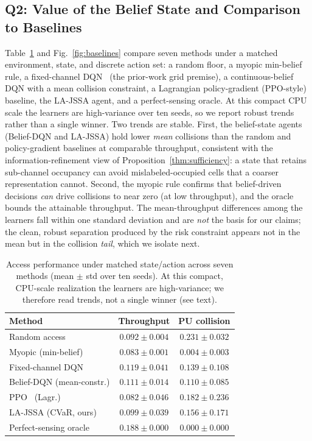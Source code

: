 \documentclass[journal]{IEEEtran}
\begin{document}
\subsection{Q2: Value of the Belief State and Comparison to Baselines}
Table~\ref{tab:metrics} and Fig.~\ref{fig:baselines} compare seven methods
under a matched environment, state, and discrete action set: a random floor,
a myopic min-belief rule, a fixed-channel DQN~\cite{wang2018} (the prior-work
grid premise), a continuous-belief DQN with a mean collision constraint, a
Lagrangian policy-gradient (PPO-style)~\cite{schulman2017ppo} baseline, the
LA-JSSA agent, and a perfect-sensing oracle. At this compact CPU scale the
learners are high-variance over ten seeds, so we report robust trends rather
than a single winner. Two trends are stable. First, the belief-state agents
(Belief-DQN and LA-JSSA) hold lower \emph{mean} collisions than the random and
policy-gradient baselines at comparable throughput, consistent with the
information-refinement view of Proposition~\ref{thm:sufficiency}: a state that
retains sub-channel occupancy can avoid mislabeled-occupied cells that a
coarser representation cannot. Second, the myopic rule confirms that
belief-driven decisions \emph{can} drive collisions to near zero (at low
throughput), and the oracle bounds the attainable throughput. The
mean-throughput differences among the learners fall within one standard
deviation and are \emph{not} the basis for our claims; the clean, robust
separation produced by the risk constraint appears not in the mean but in the
collision \emph{tail}, which we isolate next.

\begin{table}[t]
\centering
\caption{Access performance under matched state/action across seven methods
(mean $\pm$ std over ten seeds). At this compact, CPU-scale realization the
learners are high-variance; we therefore read trends, not a single winner
(see text).}
\label{tab:metrics}
\begin{tabular}{lcc}
\toprule
Method & Throughput & PU collision \\
\midrule
Random access                     & $0.092\pm0.004$ & $0.231\pm0.032$ \\
Myopic (min-belief)               & $0.083\pm0.001$ & $0.004\pm0.003$ \\
Fixed-channel DQN~\cite{wang2018} & $0.119\pm0.041$ & $0.139\pm0.108$ \\
Belief-DQN (mean-constr.)         & $0.111\pm0.014$ & $0.110\pm0.085$ \\
PPO~\cite{schulman2017ppo} (Lagr.)& $0.082\pm0.046$ & $0.182\pm0.236$ \\
LA-JSSA (CVaR, ours)              & $0.099\pm0.039$ & $0.156\pm0.171$ \\
Perfect-sensing oracle            & $0.188\pm0.000$ & $0.000\pm0.000$ \\
\bottomrule
\end{tabular}
\end{table}
\end{document}
